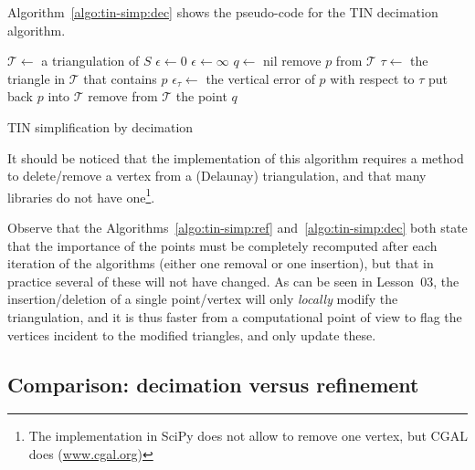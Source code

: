 Algorithm~\ref{algo:tin-simp:dec} shows the pseudo-code for the TIN decimation algorithm.
\begin{algorithm}[tb] 
	$\mathcal{T} \leftarrow$ a triangulation of $S$ \;
	$\epsilon \leftarrow 0$ \;
	{
		$\epsilon \leftarrow \infty$  \;
		$q \leftarrow$ nil \;
		{
			remove $p$ from $\mathcal{T}$ \;
			$\tau \leftarrow$ the triangle in $\mathcal{T}$ that contains $p$ \;
			$\epsilon_{\tau} \leftarrow$ the vertical error of $p$ with respect to $\tau$ \;
			put back $p$ into $\mathcal{T}$ \;
		}
		remove from $\mathcal{T}$ the point $q$ \;
	}
	\caption{TIN simplification by decimation}
	\label{algo:tin-simp:dec}
\end{algorithm}
It should be noticed that the implementation of this algorithm requires a method to delete/remove a vertex from a (Delaunay) triangulation, and that many libraries do not have one\footnote{The implementation in SciPy does not allow to remove one vertex, but CGAL does (\url{www.cgal.org})}.

Observe that the Algorithms~\ref{algo:tin-simp:ref} and~\ref{algo:tin-simp:dec} both state that the importance of the points must be completely recomputed after each iteration of the algorithms (either one removal or one insertion), but that in practice several of these will not have changed.
As can be seen in Lesson~03, the insertion/deletion of a single point/vertex will only \emph{locally} modify the triangulation, and it is thus faster from a computational point of view to flag the vertices incident to the modified triangles, and only update these.


%
\subsection{Comparison: decimation versus refinement}

%

